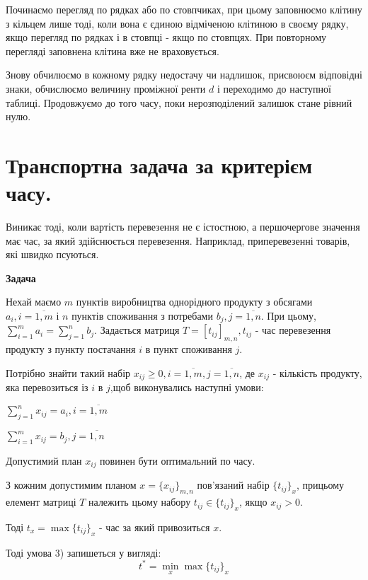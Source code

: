 \documentclass[12pt,a4paper]{report}
\newenvironment{slim_enumerate}{
\begin{enumerate}
  \setlength{\itemsep}{1pt}
  \setlength{\parskip}{0pt}
  \setlength{\parsep}{0pt}}
{\end{enumerate}}
\begin{document}
Починаємо перегляд по рядках або по стовпчиках, при цьому заповнюємо клітину з кільцем лише тоді, коли вона є єдиною відміченою клітиною в своєму рядку, якщо перегляд по рядках і в стовпці - якщо по стовпцях. При повторному перегляді заповнена клітина вже не враховується.

Знову обчилюємо в кожному рядку недостачу чи надлишок, присвоюєм відповідні знаки, обчислюємо величину проміжної ренти $d$ і переходимо до наступної таблиці. Продовжуємо до того часу, поки нерозподілений залишок стане рівний нулю.

\clearpage

\chapter{Транспортна задача за критерієм часу.}

Виникає тоді, коли вартість перевезення не є істостною, а першочергове значення має час, за який здійснюється перевезення. Наприклад, приперевезенні товарів, які швидко псуються.

{\bf Задача}

Нехай маємо $m$ пунктів виробництва однорідного продукту з обсягами $a_i, i = \overline{1,m}$ і $n$ пунктів споживання з потребами $b_j, j= \overline{1,n}$. При цьому, $\sum_{i=1}^m a_i = \sum_{j=1}^n b_j$. Задається матриця $T=[t_{ij}]_{m,n}, t_{ij}$ - час перевезення продукту з пункту постачання $i$ в пункт споживання $j$.

Потрібно знайти такий набір $x_{ij} \geq 0, i = \overline{1,m}, j = \overline{1,n}$, де $x_{ij}$ - кількість продукту, яка перевозиться із $i$ в $j$,щоб виконувались наступні умови:
\begin{slim_enumerate}
  \item $ \sum_{j=1}^n x_{ij} = a_i, i = \overline{1,m} $
  \item $ \sum_{i=1}^m x_{ij} = b_j, j = \overline{1,n} $
  \item Допустимий план $x_{ij}$ повинен бути оптимальний по часу.
\end{slim_enumerate}

З кожним допустимим планом $x=\{x_{ij}\}_{m,n}$ пов’язаний набір $\{t_{ij}\}_x$, прицьому елемент матриці $T$ належить цьому набору $t_{ij} \in \{t_{ij}\}_x$, якщо $x_{ij}>0$.

Тоді $t_x = \max \{t_{ij}\}_x$ - час за який привозиться $x$.

Тоді умова 3) запишеться у вигляді:
\[ t^*=\displaystyle\min_x \max \{t_{ij}\}_x \]
\end{document}
